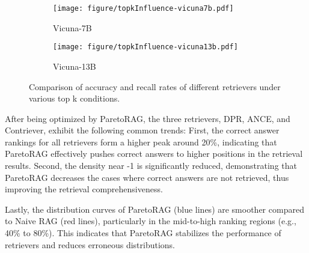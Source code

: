 
\begin{figure}[ht!]
    \centering
    \begin{subfigure}[b]{0.23\textwidth} %
        \centering
        \texttt{[image: figure/topkInfluence-vicuna7b.pdf]}
        \caption{Vicuna-7B}
        \label{fig:vicuna-7b topk}
        \vspace{-5pt} %
    \end{subfigure}
    \begin{subfigure}[b]{0.23\textwidth} %
        \centering
        \texttt{[image: figure/topkInfluence-vicuna13b.pdf]}
        \caption{Vicuna-13B}
        \label{fig:vicuna-13b topk}
        \vspace{-5pt} %
    \end{subfigure}
    \caption{Comparison of accuracy and recall rates of different retrievers under various top k conditions.}
    \label{fig:impact of topk size}
\end{figure}


After being optimized by ParetoRAG, the three retrievers, DPR, ANCE, and Contriever, exhibit the following common trends: First, the correct answer rankings for all retrievers form a higher peak around 20\%, indicating that ParetoRAG effectively pushes correct answers to higher positions in the retrieval results. Second, the density near -1 is significantly reduced, demonstrating that ParetoRAG decreases the cases where correct answers are not retrieved, thus improving the retrieval comprehensiveness. 

Lastly, the distribution curves of ParetoRAG (blue lines) are smoother compared to Naive RAG (red lines), particularly in the mid-to-high ranking regions (e.g., 40\% to 80\%). This indicates that ParetoRAG stabilizes the performance of retrievers and reduces erroneous distributions.



